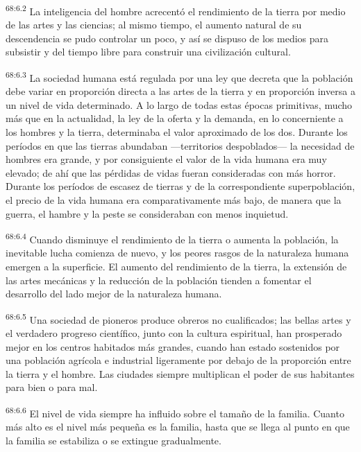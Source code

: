 \documentclass[twoside, 11pt]{book}
\begin{document}
\par
\textsuperscript{68:6.2} La inteligencia del hombre acrecentó el rendimiento de la tierra por medio de las artes y las ciencias; al mismo tiempo, el aumento natural de su descendencia se pudo controlar un poco, y así se dispuso de los medios para subsistir y del tiempo libre para construir una civilización cultural.

\par
\textsuperscript{68:6.3} La sociedad humana está regulada por una ley que decreta que la población debe variar en proporción directa a las artes de la tierra y en proporción inversa a un nivel de vida determinado. A lo largo de todas estas épocas primitivas, mucho más que en la actualidad, la ley de la oferta y la demanda, en lo concerniente a los hombres y la tierra, determinaba el valor aproximado de los dos. Durante los períodos en que las tierras abundaban ---territorios despoblados--- la necesidad de hombres era grande, y por consiguiente el valor de la vida humana era muy elevado; de ahí que las pérdidas de vidas fueran consideradas con más horror. Durante los períodos de escasez de tierras y de la correspondiente superpoblación, el precio de la vida humana era comparativamente más bajo, de manera que la guerra, el hambre y la peste se consideraban con menos inquietud.

\par
\textsuperscript{68:6.4} Cuando disminuye el rendimiento de la tierra o aumenta la población, la inevitable lucha comienza de nuevo, y los peores rasgos de la naturaleza humana emergen a la superficie. El aumento del rendimiento de la tierra, la extensión de las artes mecánicas y la reducción de la población tienden a fomentar el desarrollo del lado mejor de la naturaleza humana.

\par
\textsuperscript{68:6.5} Una sociedad de pioneros produce obreros no cualificados; las bellas artes y el verdadero progreso científico, junto con la cultura espiritual, han prosperado mejor en los centros habitados más grandes, cuando han estado sostenidos por una población agrícola e industrial ligeramente por debajo de la proporción entre la tierra y el hombre. Las ciudades siempre multiplican el poder de sus habitantes para bien o para mal.

\par
\textsuperscript{68:6.6} El nivel de vida siempre ha influido sobre el tamaño de la familia. Cuanto más alto es el nivel más pequeña es la familia, hasta que se llega al punto en que la familia se estabiliza o se extingue gradualmente.
\end{document}
